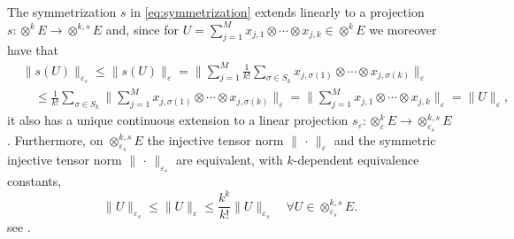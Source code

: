 \documentclass[reqno]{amsart}
\numberwithin{equation}{section}
\newcommand{\xk}{\otimes^k}
\newcommand{\xks}{\otimes^{k,s}}
\newcommand{\xkeps}{\otimes^k_\varepsilon}
\newcommand{\xkseps}{\otimes^{k,s}_{\varepsilon_s}}
\newcommand{\tenvec}{U}
\newcommand{\norm}[2]{     \| #1       \|_{ #2 }}
\newcommand{\from}{\colon}
\newcommand{\eps}{\varepsilon}
\newcommand{\sym}{s}
\theoremstyle{remark}
\theoremstyle{definition}
\begin{document}
The symmetrization  
$\sym$ in \eqref{eq:symmetrization} 
extends linearly 
to a projection $\sym \from {\xk} E \to \xks E$  
and, since for 
$\tenvec=\sum_{j=1}^M x_{j,1}\otimes \cdots \otimes x_{j,k} \in \xk E$ 
we moreover have that 
% 
\begin{equation}\label{eq:norm-rel} 
\begin{split}  
&\norm{\sym(\tenvec)}{\eps_s} 
\leq 
\norm{\sym(\tenvec)}{\eps} 
= 
\biggl\| 
\sum_{j=1}^M 
\frac{1}{k!} 
\sum_{\sigma\in S_k} 
x_{j,\sigma(1)} \otimes 
\cdots \otimes x_{j,\sigma(k)} 
\biggr\|_{\eps} 
\\
&\quad\leq 
\frac{1}{k!} 
\sum_{\sigma\in S_k} 
\biggl\| 
\sum_{j=1}^M 
x_{j,\sigma(1)} \otimes 
\cdots \otimes x_{j,\sigma(k)} 
\biggr\|_{\eps}  
=
\biggl\| 
\sum_{j=1}^M 
x_{j,1} \otimes 
\cdots \otimes x_{j,k} 
\biggr\|_{\eps} 
= 
\norm{\tenvec}{\eps}, 
\end{split}
\end{equation} 
%
it also has a unique continuous extension 
to a linear projection 
$\sym_\eps\from {\xkeps} E \to \xkseps E$. 
Furthermore, 
on $\xkseps E$ 
the injective tensor norm $\norm{\,\cdot\,}{\eps}$ 
and the symmetric injective tensor norm $\norm{\,\cdot\,}{\eps_s}$ 
are equivalent, with 
$k$-dependent equivalence constants, 
% 
\begin{equation}\label{eq:eps-norm-equivalence} 
\norm{ \tenvec }{\eps_s} 
\leq 
\norm{ \tenvec }{\eps} 
\leq 
\frac{k^k}{k!} 
\norm{ \tenvec }{\eps_s} 
\quad 
\forall 
\tenvec \in \xkseps E. 
\end{equation} 
%  
see \cite[Section~2.3 and~2.7]{Floret2001}. 
\end{document}

